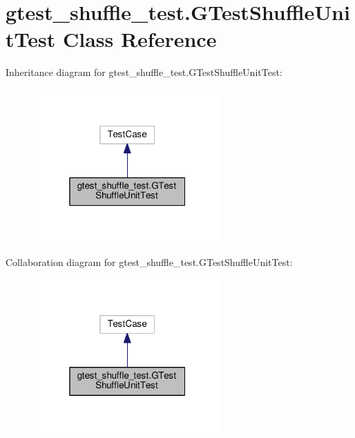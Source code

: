 \hypertarget{classgtest__shuffle__test_1_1GTestShuffleUnitTest}{}\section{gtest\+\_\+shuffle\+\_\+test.\+G\+Test\+Shuffle\+Unit\+Test Class Reference}
\label{classgtest__shuffle__test_1_1GTestShuffleUnitTest}


Inheritance diagram for gtest\+\_\+shuffle\+\_\+test.\+G\+Test\+Shuffle\+Unit\+Test\+:\nopagebreak
\begin{figure}[H]
\begin{center}
\leavevmode
\includegraphics[width=205pt]{classgtest__shuffle__test_1_1GTestShuffleUnitTest__inherit__graph}
\end{center}
\end{figure}


Collaboration diagram for gtest\+\_\+shuffle\+\_\+test.\+G\+Test\+Shuffle\+Unit\+Test\+:\nopagebreak
\begin{figure}[H]
\begin{center}
\leavevmode
\includegraphics[width=205pt]{classgtest__shuffle__test_1_1GTestShuffleUnitTest__coll__graph}
\end{center}
\end{figure}
